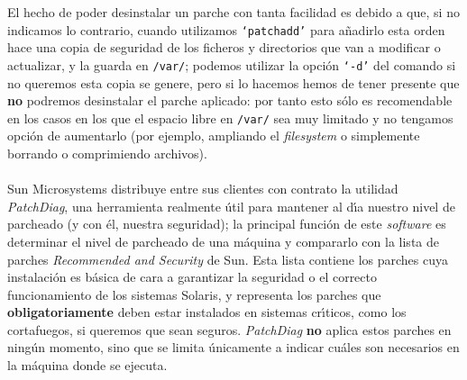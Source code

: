 El hecho de poder desinstalar un parche con tanta facilidad es debido a que,
si no indicamos lo contrario, cuando utilizamos {\tt `patchadd'} para a\~nadirlo
esta orden hace una copia de seguridad de los ficheros y directorios
que van a modificar o actualizar, y la guarda en {\tt /var/}; podemos utilizar
la opci\'on {\tt `-d'} del comando si no queremos esta copia se genere, pero si
lo hacemos hemos de tener presente que {\bf no} podremos desinstalar el parche
aplicado: por tanto esto s\'olo es recomendable en los casos en los que el
espacio libre en {\tt /var/} sea muy limitado y no tengamos opci\'on de 
aumentarlo (por ejemplo, ampliando el {\it filesystem} o simplemente borrando o
comprimiendo archivos).\\
\\Sun Microsystems distribuye entre sus clientes con contrato la utilidad {\it 
PatchDiag}, una herramienta realmente \'util para mantener al d\'{\i}a nuestro
nivel de parcheado (y con \'el, nuestra seguridad); la principal funci\'on de
este {\it software} es determinar el nivel de parcheado de una m\'aquina y
compararlo con la lista de parches {\it Recommended and Security} de Sun. Esta
lista contiene los parches cuya instalaci\'on es b\'asica de cara a garantizar
la seguridad o el correcto funcionamiento de los sistemas Solaris, y 
representa los parches que {\bf obligatoriamente} deben estar instalados en 
sistemas cr\'{\i}ticos, como los cortafuegos, si queremos que sean seguros.
{\it PatchDiag} {\bf no} aplica estos parches en ning\'un momento, sino que se
limita \'unicamente a indicar cu\'ales son necesarios en la m\'aquina donde se
ejecuta.

